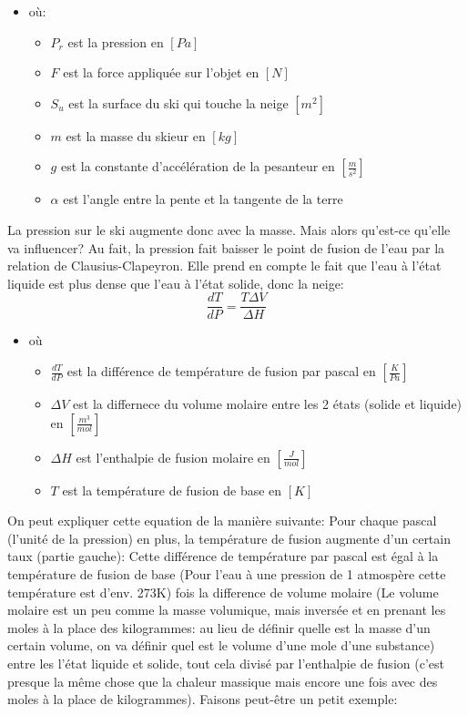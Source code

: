 \documentclass{article}
\begin{document}
\begin{itemize}
    \item où:
    \begin{itemize}
        \item $P_r$ est la pression en $[Pa]$
        \item $F$ est la force appliquée sur l'objet en $[N]$
        \item $S_u$ est la surface du ski qui touche la neige $[m^2]$
        \item $m$ est la masse du skieur en $[kg]$
        \item $g$ est la constante d'accélération de la pesanteur en $[\frac{m}{s^2}]$
        \item $\alpha$ est l'angle entre la pente et la tangente de la terre
    \end{itemize}
\end{itemize}

La pression sur le ski augmente donc avec la masse. Mais alors qu'est-ce qu'elle va influencer? Au fait, la pression fait baisser le point de fusion de l'eau par la relation de Clausius-Clapeyron. Elle prend en compte le fait que l'eau à l'état liquide est plus dense que l'eau à l'état solide, donc la neige:
\begin{equation}
    \label{Clausius-Clapeyron}
    \frac{dT}{dP} = \frac{T\Delta{V}}{\Delta{H}}
\end{equation}
\begin{itemize}
    \item où
    \begin{itemize}
        \item $\frac{dT}{dP}$ est la différence de température de fusion par pascal en $[\frac{K}{Pa}]$
        \item $\Delta{V}$ est la differnece du volume molaire entre les 2 états (solide et liquide) en $[\frac{m^3}{mol}]$
        \item $\Delta{H}$ est l'enthalpie de fusion molaire en $[\frac{J}{mol}]$
        \item $T$ est la température de fusion de base en $[K]$
    \end{itemize}
\end{itemize}

\vspace{0.2cm}

On peut expliquer cette equation de la manière suivante: Pour chaque pascal (l'unité de la pression) en plus, la température de fusion augmente d'un certain taux (partie gauche): Cette différence de température par pascal est égal à la température de fusion de base (Pour l'eau à une pression de 1 atmospère cette température est d'env. 273K) fois la difference de volume molaire (Le volume molaire est un peu comme la masse volumique, mais inversée et en prenant les moles à la place des kilogrammes: au lieu de définir quelle est la masse d'un certain volume, on va définir quel est le volume d'une mole d'une substance) entre les l'état liquide et solide, tout cela divisé par l'enthalpie de fusion (c'est presque la même chose que la chaleur massique mais encore une fois avec des moles à la place de kilogrammes). Faisons peut-être un petit exemple:
\end{document}
